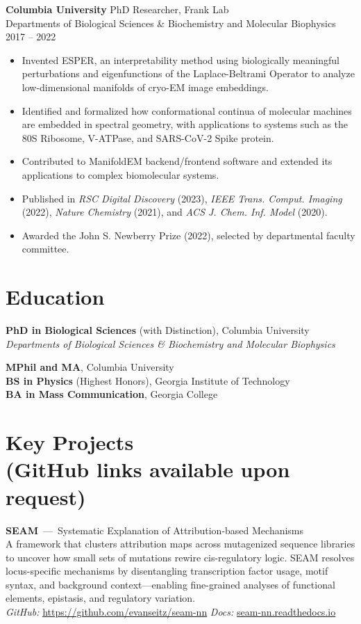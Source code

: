 \documentclass[11pt]{article}
\begin{document}
\textbf{Columbia University} \hfill PhD Researcher, Frank Lab\\
Departments of Biological Sciences \& Biochemistry and Molecular Biophysics \hfill 2017 -- 2022
\begin{itemize}
    \item Invented ESPER, an interpretability method using biologically meaningful perturbations and eigenfunctions of the Laplace-Beltrami Operator to analyze low-dimensional manifolds of cryo-EM image embeddings.
    \item Identified and formalized how conformational continua of molecular machines are embedded in spectral geometry, with applications to systems such as the 80S Ribosome, V-ATPase, and SARS-CoV-2 Spike protein.
    \item Contributed to ManifoldEM backend/frontend software and extended its applications to complex biomolecular systems.
    \item Published in \textit{RSC Digital Discovery} (2023), \textit{IEEE Trans. Comput. Imaging} (2022), \textit{Nature Chemistry} (2021), and \textit{ACS J. Chem. Inf. Model} (2020).
    \item Awarded the John S. Newberry Prize (2022), selected by departmental faculty committee.
\end{itemize}

\section*{Education}
\textbf{PhD in Biological Sciences} (with Distinction), Columbia University\\
\textit{Departments of Biological Sciences \& Biochemistry and Molecular Biophysics}

\textbf{MPhil and MA}, Columbia University\\
\textbf{BS in Physics} (Highest Honors), Georgia Institute of Technology\\
\textbf{BA in Mass Communication}, Georgia College

\section*{Key Projects \\ \normalfont\normalsize (GitHub links available upon request)}
\textbf{SEAM} \,---\, Systematic Explanation of Attribution-based Mechanisms\\
A framework that clusters attribution maps across mutagenized sequence libraries to uncover how small sets of mutations rewire cis-regulatory logic. SEAM resolves locus-specific mechanisms by disentangling transcription factor usage, motif syntax, and background context—enabling fine-grained analyses of functional elements, epistasis, and regulatory variation.\\
\textit{GitHub:} \url{https://github.com/evanseitz/seam-nn}
\textit{Docs:} \href{https://seam-nn.readthedocs.io}{seam-nn.readthedocs.io}
\end{document}
